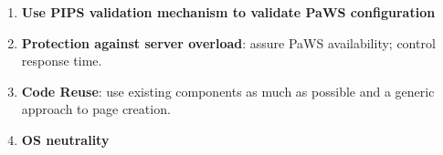 \begin{enumerate}
  \item {\bf Use PIPS validation mechanism to validate PaWS
      configuration}

  \item {\bf Protection against server overload}: assure PaWS
    availability; control response time.

  \item {\bf Code Reuse}: use existing components as much as possible
    and a generic approach to page creation.

  \item {\bf OS neutrality}

\end{enumerate}

